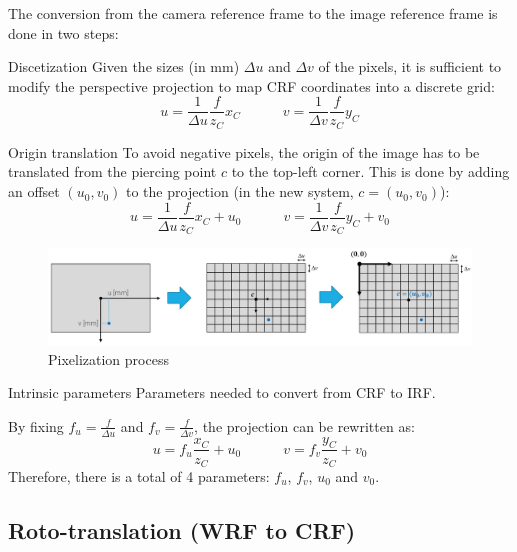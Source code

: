 The conversion from the camera reference frame to the image reference frame
is done in two steps:
\begin{descriptionlist}
    \item[Discetization] 
        Given the sizes (in mm) $\Delta u$ and $\Delta v$ of the pixels,
        it is sufficient to modify the perspective projection to map CRF coordinates into a discrete grid:
        \[ 
            u = \frac{1}{\Delta u}\frac{f}{z_C}x_C 
            \hspace{3em} 
            v = \frac{1}{\Delta v}\frac{f}{z_C}y_C 
        \]

    \item[Origin translation] 
        To avoid negative pixels, the origin of the image has to be translated from the piercing point $c$ to the top-left corner.
        This is done by adding an offset $(u_0, v_0)$ to the projection (in the new system, $c = (u_0, v_0)$):
        \[ 
            u = \frac{1}{\Delta u}\frac{f}{z_C}x_C + u_0
            \hspace{3em} 
            v = \frac{1}{\Delta v}\frac{f}{z_C}y_C +v_0
        \]

    \begin{figure}[H]
        \centering
        \includegraphics[width=0.9\linewidth]{./img/_pixelization.pdf}
        \caption{Pixelization process}
    \end{figure}

    \item[Intrinsic parameters] 
        Parameters needed to convert from CRF to IRF.

        By fixing $f_u = \frac{f}{\Delta u}$ and $f_v = \frac{f}{\Delta v}$, the projection can be rewritten as:
        \[ 
            u = f_u\frac{x_C}{z_C} + u_0
            \hspace{3em} 
            v = f_v\frac{y_C}{z_C} +v_0
        \]
        Therefore, there is a total of 4 parameters: $f_u$, $f_v$, $u_0$ and $v_0$.
\end{descriptionlist}


\subsection{Roto-translation (WRF to CRF)}

